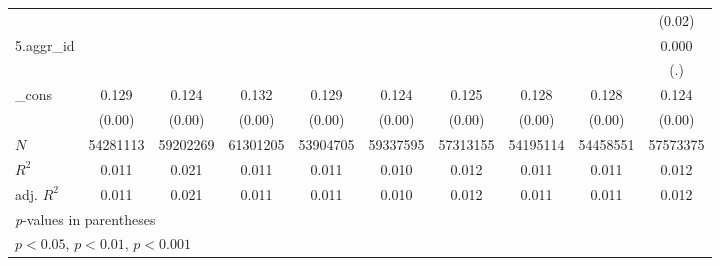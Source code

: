 {\begin{tabular}{l*{9}{c}}
          &                  &                  &                  &                  &                  &                  &                  &                  &   (0.02)         \\
[1em]
5.aggr\_id &                  &                  &                  &                  &                  &                  &                  &                  &    0.000         \\
          &                  &                  &                  &                  &                  &                  &                  &                  &      (.)         \\
[1em]
\_cons    &    0.129\sym{***}&    0.124\sym{***}&    0.132\sym{***}&    0.129\sym{***}&    0.124\sym{***}&    0.125\sym{***}&    0.128\sym{***}&    0.128\sym{***}&    0.124\sym{***}\\
          &   (0.00)         &   (0.00)         &   (0.00)         &   (0.00)         &   (0.00)         &   (0.00)         &   (0.00)         &   (0.00)         &   (0.00)         \\
\hline
\(N\)     & 54281113         & 59202269         & 61301205         & 53904705         & 59337595         & 57313155         & 54195114         & 54458551         & 57573375         \\
\(R^{2}\) &    0.011         &    0.021         &    0.011         &    0.011         &    0.010         &    0.012         &    0.011         &    0.011         &    0.012         \\
adj. \(R^{2}\)&    0.011         &    0.021         &    0.011         &    0.011         &    0.010         &    0.012         &    0.011         &    0.011         &    0.012         \\
\hline\hline
\multicolumn{10}{l}{\footnotesize \textit{p}-values in parentheses}\\
\multicolumn{10}{l}{\footnotesize \sym{*} \(p<0.05\), \sym{**} \(p<0.01\), \sym{***} \(p<0.001\)}\\
\end{tabular}
}
